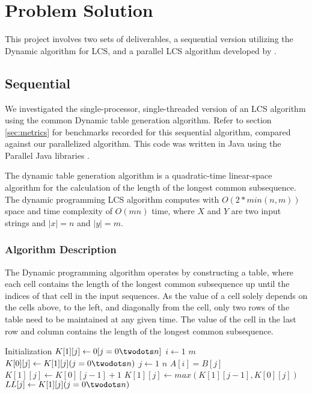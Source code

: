 \section{Problem Solution}
This project involves two sets of deliverables, a sequential version
utilizing the Dynamic algorithm for LCS, and a parallel LCS algorithm
developed by \cite{Liu:2007p402}.

\subsection{Sequential}
We investigated the single-processor, single-threaded version of an
LCS algorithm using the common Dynamic table generation
algorithm. Refer to section \ref{sec:metrics} for benchmarks recorded
for this sequential algorithm, compared against our parallelized
algorithm. This code was written in Java using the Parallel Java
libraries \cite{pj}.

The dynamic table generation algorithm is a quadratic-time
linear-space algorithm for the calculation of the length of the
longest common subsequence. The dynamic programming LCS algorithm
computes with $O(2*min(n,m))$ space and time complexity of $O(mn)$
time, where $X$ and $Y$ are two input strings and $|x| = n$ and $|y| =
m$.

\subsubsection{Algorithm Description}
The Dynamic programming algorithm operates by constructing a table,
where each cell contains the length of the longest common subsequence
up until the indices of that cell in the input sequences. As the value
of a cell solely depends on the cells above, to the left, and
diagonally from the cell, only two rows of the table need to be
maintained at any given time. The value of the cell in the last row
and column contains the length of the longest common subsequence.
 
\begin{codebox}
\li	\Comment Initialization
\li $K[1][j] \gets 0 [j=0 \twodots n]$
\li \For $i \gets 1$ \To $m$ 
\li	\Do
\li 	$K[0][j] \gets K[1][j] (j=0\twodots n)$
\li 	\For $j \gets 1$ \To $n$ 
\li		\Do
\li			\If $A[i] = B[j]$ 
\li			\Then 
\li				$K[1][j] \gets K[0][j-1] + 1$
\li			\Else
\li				$K[1][j] \gets max(K[1][j-1], K[0][j])$
			\End
		\End
	\End
\li	$LL[j] \gets K[1][j] (j=0\twodots n)$
\end{codebox}

